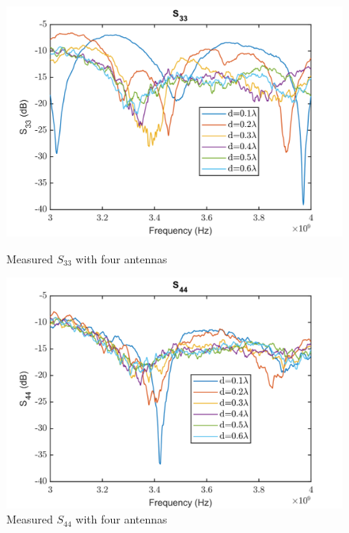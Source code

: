 \begin{figure}[H]
  \centering
  \begin{minipage}[b]{0.5\textwidth}
	\includegraphics[scale = 0.5]{figures/measurement/antennas/spar_four_ant_s33.png}
	\caption{Measured $S_{33}$ with four antennas}
    \label{fig:chamber_four_ant_s33}
  \end{minipage}
  \hfill
  \begin{minipage}[b]{0.4\textwidth}
\includegraphics[scale = 0.5]{figures/measurement/antennas/spar_four_ant_s44.png}
\caption{Measured $S_{44}$ with four antennas}
    \label{fig:chamber_four_ant_s44}
  \end{minipage}
\end{figure}


